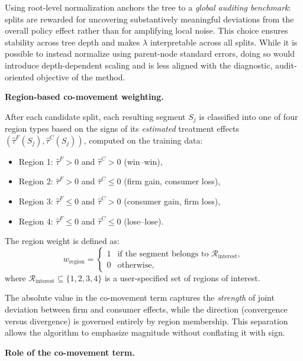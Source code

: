 \documentclass[11pt,letterpaper,english]{article}
\theoremstyle{definition}
\theoremstyle{definition}
\begin{document}
\begin{bibunit}
Using root-level normalization anchors the tree to a \emph{global auditing benchmark}: splits are rewarded for uncovering substantively meaningful deviations from the overall policy effect rather than for amplifying local noise. This choice ensures stability across tree depth and makes $\lambda$ interpretable across all splits. While it is possible to instead normalize using parent-node standard errors, doing so would introduce depth-dependent scaling and is less aligned with the diagnostic, audit-oriented objective of the method.

\vspace{6pt}

\noindent
\textbf{Region-based co-movement weighting.}

After each candidate split, each resulting segment $S_j$ is classified into one of four region types based on the signs of its \emph{estimated} treatment effects $(\hat{\tau}^F(S_j), \hat{\tau}^C(S_j))$, computed on the training data:
\begin{itemize}
    \item Region 1: $\hat{\tau}^F > 0$ and $\hat{\tau}^C > 0$ (win--win),
    \item Region 2: $\hat{\tau}^F > 0$ and $\hat{\tau}^C \leq 0$ (firm gain, consumer loss),
    \item Region 3: $\hat{\tau}^F \leq 0$ and $\hat{\tau}^C > 0$ (consumer gain, firm loss),
    \item Region 4: $\hat{\tau}^F \leq 0$ and $\hat{\tau}^C \leq 0$ (lose--lose).
\end{itemize}

The region weight is defined as:
\[
w_{\text{region}} =
\begin{cases}
1 & \text{if the segment belongs to } \mathcal{R}_{\text{interest}}, \\
0 & \text{otherwise},
\end{cases}
\]
where $\mathcal{R}_{\text{interest}} \subseteq \{1,2,3,4\}$ is a user-specified set of regions of interest.

The absolute value in the co-movement term captures the \emph{strength} of joint deviation between firm and consumer effects, while the direction (convergence versus divergence) is governed entirely by region membership. This separation allows the algorithm to emphasize magnitude without conflating it with sign.

\vspace{6pt}

\noindent
\textbf{Role of the co-movement term.}


\end{bibunit}
\end{document}
